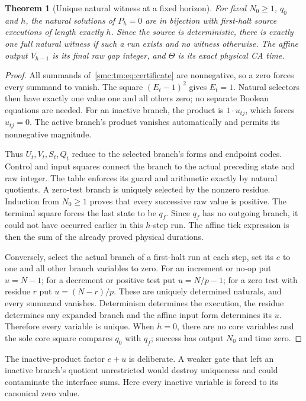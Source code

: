 \documentclass[11pt,letterpaper]{article}
\numberwithin{equation}{section}
\newtheorem{theorem}{Theorem}[section]
\theoremstyle{definition}
\theoremstyle{remark}
\begin{document}
\begin{theorem}[Unique natural witness at a fixed horizon]\label{smc:tm:thm:certificate}
For fixed $N_0\ge1$, $q_0$ and $h$, the natural solutions of $P_h=0$ are in bijection with first-halt source executions of length exactly $h$. Since the source is deterministic, there is exactly one full natural witness if such a run exists and no witness otherwise. The affine output $V_{h-1}$ is its final raw gap integer, and $\Theta$ is its exact physical CA time.
\end{theorem}
\begin{proof}
All summands of~\eqref{smc:tm:eq:certificate} are nonnegative, so a zero forces every summand to vanish. The square $(E_t-1)^2$ gives $E_t=1$. Natural selectors then have exactly one value one and all others zero; no separate Boolean equations are needed. For an inactive branch, the product is $1\cdot u_{tj}$, which forces $u_{tj}=0$. The active branch's product vanishes automatically and permits its nonnegative magnitude.

Thus $U_t,V_t,S_t,Q_t$ reduce to the selected branch's forms and endpoint codes. Control and input squares connect the branch to the actual preceding state and raw integer. The table enforces its guard and arithmetic exactly by natural quotients. A zero-test branch is uniquely selected by the nonzero residue. Induction from $N_0\ge1$ proves that every successive raw value is positive. The terminal square forces the last state to be $q_f$. Since $q_f$ has no outgoing branch, it could not have occurred earlier in this $h$-step run. The affine tick expression is then the sum of the already proved physical durations.

Conversely, select the actual branch of a first-halt run at each step, set its $e$ to one and all other branch variables to zero. For an increment or no-op put $u=N-1$; for a decrement or positive test put $u=N/p-1$; for a zero test with residue $r$ put $u=(N-r)/p$. These are uniquely determined naturals, and every summand vanishes. Determinism determines the execution, the residue determines any expanded branch and the affine input form determines its $u$. Therefore every variable is unique. When $h=0$, there are no core variables and the sole core square compares $q_0$ with $q_f$; success has output $N_0$ and time zero.
\end{proof}

The inactive-product factor $e+u$ is deliberate. A weaker gate that left an inactive branch's quotient unrestricted would destroy uniqueness and could contaminate the interface sums. Here every inactive variable is forced to its canonical zero value.
\end{document}
